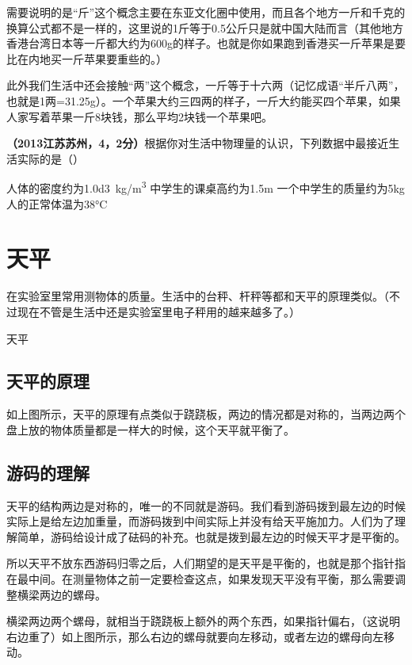 \documentclass[12pt,twoside]{exam}
\begin{document}
\begin{knowledge}
需要说明的是“斤”这个概念主要在东亚文化圈中使用，而且各个地方一斤和千克的换算公式都不是一样的，这里说的1斤等于0.5公斤只是就中国大陆而言（其他地方香港台湾日本等一斤都大约为600g的样子。也就是你如果跑到香港买一斤苹果是要比在内地买一斤苹果要重些的。）

此外我们生活中还会接触“两”这个概念，一斤等于十六两（记忆成语“半斤八两”，也就是1两=31.25g）。一个苹果大约三四两的样子，一斤大约能买四个苹果，如果人家写着苹果一斤8块钱，那么平均2块钱一个苹果吧。


\textbf{（2013江苏苏州，4，2分）}根据你对生活中物理量的认识，下列数据中最接近生活实际的是（\answerline*[A]）
\begin{choices}
\choice 人体的密度约为\SI{1.0d3}{kg/m^3}
\choice 中学生的课桌高约为1.5m
\choice 一个中学生的质量约为5kg
\choice 人的正常体温为38\si{\degreeCelsius}
\end{choices}


\section{天平}
在实验室里常用\answerline*[天平]测物体的质量。生活中的台秤、杆秤等都和天平的原理类似。（不过现在不管是生活中还是实验室里电子秤用的越来越多了。）

\begin{linefig}[0.9]{天平}
\end{linefig}

\subsection{天平的原理}
如上图所示，天平的原理有点类似于跷跷板，两边的情况都是对称的，当两边两个盘上放的物体质量都是一样大的时候，这个天平就平衡了。

\subsection{游码的理解}
天平的结构两边是对称的，唯一的不同就是游码。我们看到游码拨到最左边的时候实际上是给左边加重量，而游码拨到中间实际上并没有给天平施加力。人们为了理解简单，游码给设计成了砝码的补充。也就是拨到最左边的时候天平才是平衡的。

 所以天平不放东西游码归零之后，人们期望的是天平是平衡的，也就是那个指针指在最中间。在测量物体之前一定要检查这点，如果发现天平没有平衡，那么需要调整横梁两边的螺母。

横梁两边两个螺母，就相当于跷跷板上额外的两个东西，如果指针偏右，（这说明右边重了）如上图所示，那么右边的螺母就要向左移动，或者左边的螺母向左移动。


\end{knowledge}
\end{document}
